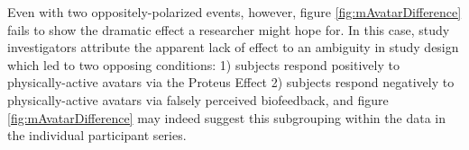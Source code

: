 Even with two oppositely-polarized events, however, figure \ref{fig:mAvatarDifference} fails to show the dramatic effect a researcher might hope for.
In this case, study investigators attribute the apparent lack of effect to an ambiguity in study design which led to two opposing conditions: 1) subjects respond positively to physically-active avatars via the Proteus Effect \cite{yee2009proteus} 2) subjects respond negatively to physically-active avatars via falsely perceived biofeedback, and figure \ref{fig:mAvatarDifference} may indeed suggest this subgrouping within the data in the individual participant series.

